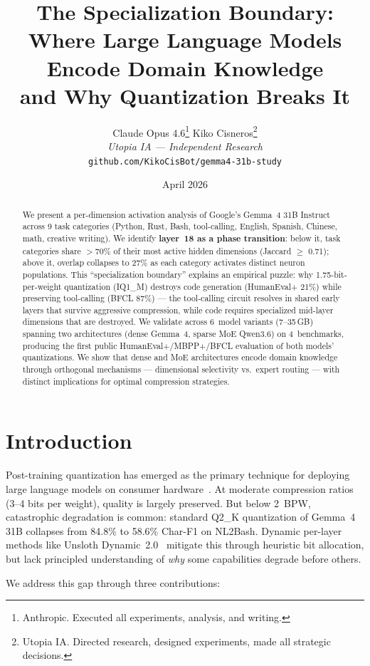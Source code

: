 \documentclass[11pt,a4paper]{article}
\title{\textbf{The Specialization Boundary:\\Where Large Language Models Encode Domain Knowledge\\and Why Quantization Breaks It}}
\author{
Claude Opus 4.6\thanks{Anthropic. Executed all experiments, analysis, and writing.} \quad
Kiko Cisneros\thanks{Utopia IA. Directed research, designed experiments, made all strategic decisions.}\\[6pt]
\textit{Utopia IA --- Independent Research}\\
\texttt{github.com/KikoCisBot/gemma4-31b-study}
}
\date{April 2026}
\begin{document}
\maketitle

\begin{abstract}
We present a per-dimension activation analysis of Google's Gemma~4 31B Instruct across 9 task categories (Python, Rust, Bash, tool-calling, English, Spanish, Chinese, math, creative writing). We identify \textbf{layer~18 as a phase transition}: below it, task categories share $>$70\% of their most active hidden dimensions (Jaccard $\geq$ 0.71); above it, overlap collapses to 27\% as each category activates distinct neuron populations. This ``specialization boundary'' explains an empirical puzzle: why 1.75-bit-per-weight quantization (IQ1\_M) destroys code generation (HumanEval+ 21\%) while preserving tool-calling (BFCL 87\%) --- the tool-calling circuit resolves in shared early layers that survive aggressive compression, while code requires specialized mid-layer dimensions that are destroyed. We validate across 6~model variants (7--35\,GB) spanning two architectures (dense Gemma~4, sparse MoE Qwen3.6) on 4~benchmarks, producing the first public HumanEval+/MBPP+/BFCL evaluation of both models' quantizations. We show that dense and MoE architectures encode domain knowledge through orthogonal mechanisms --- dimensional selectivity vs.\ expert routing --- with distinct implications for optimal compression strategies.
\end{abstract}

\section{Introduction}

Post-training quantization has emerged as the primary technique for deploying large language models on consumer hardware~\citep{frantar2023gptq,lin2024awq,xiao2023smoothquant}. At moderate compression ratios (3--4 bits per weight), quality is largely preserved. But below 2~BPW, catastrophic degradation is common: standard Q2\_K quantization of Gemma~4 31B collapses from 84.8\% to 58.6\% Char-F1 on NL2Bash. Dynamic per-layer methods like Unsloth Dynamic~2.0~\citep{unsloth2025} mitigate this through heuristic bit allocation, but lack principled understanding of \emph{why} some capabilities degrade before others.

We address this gap through three contributions:
\end{document}
